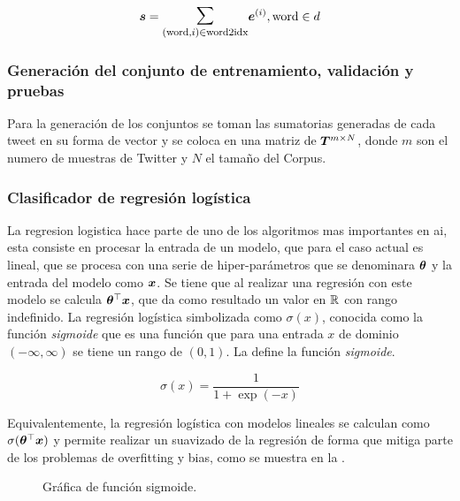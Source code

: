 \begin{equation} \label{eq:bow-word-vector-sum}
  \vs = \mathlarger{\mathlarger{\sum}}_{(\text{word}, i) \in \text{word2idx}} \ve^{(i)}, \text{word} \in d
\end{equation}

\subsubsection{Generación del conjunto de entrenamiento, validación y pruebas}
Para la generación de los conjuntos se toman las sumatorias generadas de cada tweet en su forma de vector y se coloca en una matriz de ${\bm{T}}^{m \times N}$, donde $m$ son el numero de muestras de Twitter y $N$ el tamaño del Corpus.

\subsubsection{Clasificador de regresión logística}
La regresion logistica hace parte de uno de los algoritmos mas importantes en \gls{ai}, esta consiste en procesar la entrada de un modelo, que para el caso actual es lineal, que se procesa con una serie de hiper-parámetros que se denominara ${\bm{\theta}}$ y la entrada del modelo como ${\bm{x}}$. Se tiene que al realizar una regresión con este modelo se calcula ${\bm{\theta}}^{\top} {\bm{x}}$, que da como resultado un valor en $\mathbb{R}$ con rango indefinido. La regresión logística simbolizada como $\sigma(x)$, conocida como la función \emph{sigmoide} que es una función que para una entrada $x$ de dominio $(-\infty, \infty)$ se tiene un rango de $(0, 1)$. La  define la función \emph{sigmoide}.

\begin{equation} \label{eq:logits-formula}
  \sigma(x) = \frac{1} {1 + \exp(-x)}
\end{equation}

Equivalentemente, la regresión logística con modelos lineales se calculan como $\sigma({\bm{\theta}}^{\top} {\bm{x}})$ y permite realizar un suavizado de la regresión de forma que mitiga parte de los problemas de \gls{overfitting} y \gls{bias}, como se muestra en la .

\begin{figure}[H]
  \centering
\decoRule
\caption[Gráfica de función sigmoide]{Gráfica de función sigmoide.}
\label{fig:logits-example}
\end{figure}


